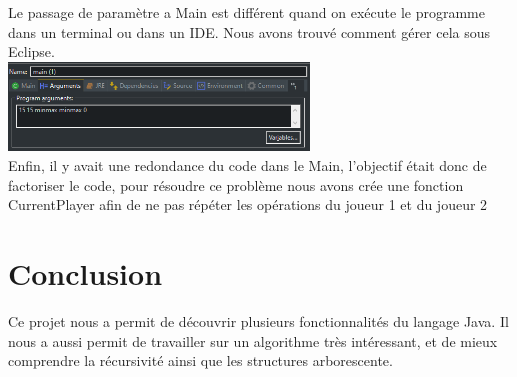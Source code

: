 Le passage de paramètre a Main est différent quand on exécute le programme dans un terminal ou dans
un IDE. Nous avons trouvé comment gérer cela sous Eclipse.
\\
\includegraphics[width=0.60\textwidth]{./MAINPARAM}
\\
\newpage
Enfin, il y avait une redondance du code dans le Main, l'objectif était donc de factoriser le code, pour résoudre ce problème nous avons crée une fonction CurrentPlayer afin de ne pas répéter les opérations du joueur 1 et du joueur 2 

\section{Conclusion}

Ce projet nous a permit de découvrir plusieurs fonctionnalités du langage Java.
Il nous a aussi permit de travailler sur un algorithme très intéressant, et de mieux
comprendre la récursivité ainsi que les structures arborescente.
